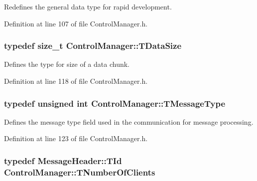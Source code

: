 Redefines the general data type for rapid development. 



Definition at line 107 of file Control\-Manager.\-h.

\hypertarget{class_control_manager_a5c898e9e00806858a59700370560aea7}{
\subsubsection[{T\-Data\-Size}]{\setlength{\rightskip}{0pt plus 5cm}typedef size\-\_\-t {\bf Control\-Manager\-::\-T\-Data\-Size}\hspace{0.3cm}{\ttfamily [private]}}}\label{class_control_manager_a5c898e9e00806858a59700370560aea7}


Defines the type for size of a data chunk. 



Definition at line 118 of file Control\-Manager.\-h.

\hypertarget{class_control_manager_a36b60e90749624a648dc225c2c136397}{
\subsubsection[{T\-Message\-Type}]{\setlength{\rightskip}{0pt plus 5cm}typedef unsigned int {\bf Control\-Manager\-::\-T\-Message\-Type}\hspace{0.3cm}{\ttfamily [private]}}}\label{class_control_manager_a36b60e90749624a648dc225c2c136397}


Defines the message type field used in the communication for message processing. 



Definition at line 123 of file Control\-Manager.\-h.

\hypertarget{class_control_manager_a7eefb0a4e9d10e65771939912d650bcc}{
\subsubsection[{T\-Number\-Of\-Clients}]{\setlength{\rightskip}{0pt plus 5cm}typedef {\bf Message\-Header\-::\-T\-Id} {\bf Control\-Manager\-::\-T\-Number\-Of\-Clients}}}\label{class_control_manager_a7eefb0a4e9d10e65771939912d650bcc}


